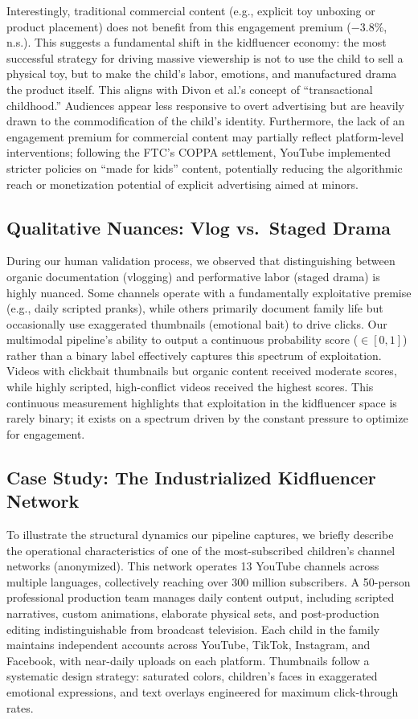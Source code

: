 \documentclass[]{ieeeaccess}
\begin{document}
Interestingly, traditional commercial content (e.g., explicit toy unboxing or product placement) does not benefit from this engagement premium ($-3.8\%$, n.s.). This suggests a fundamental shift in the kidfluencer economy: the most successful strategy for driving massive viewership is not to use the child to sell a physical toy, but to make the child's labor, emotions, and manufactured drama the product itself. This aligns with Divon et al.'s \cite{divon2025children} concept of ``transactional childhood.'' Audiences appear less responsive to overt advertising but are heavily drawn to the commodification of the child's identity. Furthermore, the lack of an engagement premium for commercial content may partially reflect platform-level interventions; following the FTC's COPPA settlement, YouTube implemented stricter policies on ``made for kids'' content, potentially reducing the algorithmic reach or monetization potential of explicit advertising aimed at minors. 

\subsection{Qualitative Nuances: Vlog vs.\ Staged Drama}

During our human validation process, we observed that distinguishing between organic documentation (vlogging) and performative labor (staged drama) is highly nuanced. Some channels operate with a fundamentally exploitative premise (e.g., daily scripted pranks), while others primarily document family life but occasionally use exaggerated thumbnails (emotional bait) to drive clicks. Our multimodal pipeline's ability to output a continuous probability score ($\in [0, 1]$) rather than a binary label effectively captures this spectrum of exploitation. Videos with clickbait thumbnails but organic content received moderate scores, while highly scripted, high-conflict videos received the highest scores. This continuous measurement highlights that exploitation in the kidfluencer space is rarely binary; it exists on a spectrum driven by the constant pressure to optimize for engagement.

\subsection{Case Study: The Industrialized Kidfluencer Network}

To illustrate the structural dynamics our pipeline captures, we briefly describe the operational characteristics of one of the most-subscribed children's channel networks (anonymized). This network operates 13 YouTube channels across multiple languages, collectively reaching over 300 million subscribers. A 50-person professional production team manages daily content output, including scripted narratives, custom animations, elaborate physical sets, and post-production editing indistinguishable from broadcast television. Each child in the family maintains independent accounts across YouTube, TikTok, Instagram, and Facebook, with near-daily uploads on each platform. Thumbnails follow a systematic design strategy: saturated colors, children's faces in exaggerated emotional expressions, and text overlays engineered for maximum click-through rates.
\end{document}
